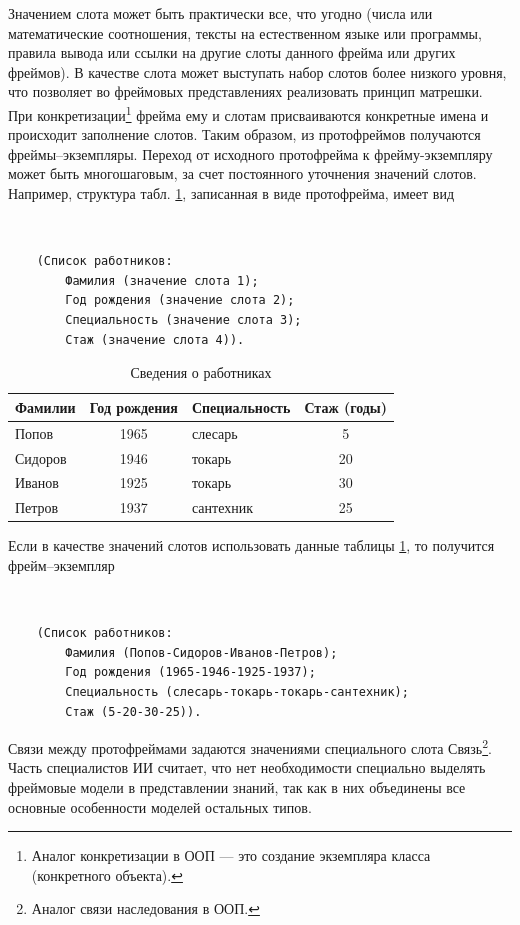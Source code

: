 \documentclass[12pt, openany, twoside]{book} %
\begin{document}
Значением слота может быть практически все, что угодно (числа или математические соотношения, тексты на естественном языке или программы, правила вывода или ссылки на другие слоты данного фрейма или других фреймов). В качестве слота может выступать набор слотов более низкого уровня, что позволяет во фреймовых представлениях реализовать принцип матрешки. При конкретизации\footnote{Аналог конкретизации в ООП --- это создание экземпляра класса (конкретного объекта).} фрейма ему и слотам присваиваются конкретные имена и происходит заполнение слотов. Таким образом, из протофреймов получаются фреймы--экземпляры. Переход от исходного протофрейма к фрейму-эк\-зем\-пля\-ру может быть многошаговым, за счет постоянного
уточнения значений слотов. Например, структура табл. \ref{tab:frame}, записанная в виде протофрейма, имеет вид
{\tt
\begin{verbatim}
    (Список работников:
        Фамилия (значение слота 1);
        Год рождения (значение слота 2);
        Специальность (значение слота 3);
        Стаж (значение слота 4)).
\end{verbatim}}

\begin{table}[h]
\begin{center}
\begin{tabular}{|lclc|}
 \hline
 Фамилии & Год рождения  &  Специальность &  Стаж (годы)
 \\\hline\hline
 Попов &  1965 &   слесарь & 5
   \\\hline
   Сидоров & 1946  &  токарь & 20
    \\\hline
    Иванов & 1925  &  токарь & 30
    \\\hline
    Петров & 1937  &  сантехник &  25
    \\\hline
\end{tabular}
\end{center}
\caption{Сведения о работниках} \label{tab:frame}
\end{table}

Если в качестве значений слотов использовать данные таблицы \ref{tab:frame}, то получится фрейм--экземпляр
{\tt
\begin{verbatim}
    (Список работников:
        Фамилия (Попов-Сидоров-Иванов-Петров);
        Год рождения (1965-1946-1925-1937);
        Специальность (слесарь-токарь-токарь-сантехник);
        Стаж (5-20-30-25)).
\end{verbatim}}

Связи между протофреймами задаются значениями специального слота Связь\footnote{Аналог связи наследования в ООП.}. Часть специалистов ИИ считает, что нет необходимости специально выделять фреймовые модели в представлении знаний, так как в них объединены все основные особенности моделей остальных типов.
\end{document}
